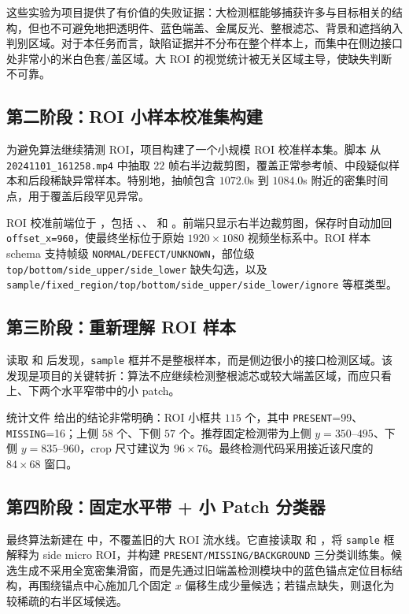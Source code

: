 \documentclass[a4paper,12pt]{article}
\newcommand{\code}[1]{\texttt{#1}}
\begin{document}
这些实验为项目提供了有价值的失败证据：大检测框能够捕获许多与目标相关的结构，但也不可避免地把透明件、蓝色端盖、金属反光、整根滤芯、背景和遮挡纳入判别区域。对于本任务而言，缺陷证据并不分布在整个样本上，而集中在侧边接口处非常小的米白色套/盖区域。大 ROI 的视觉统计被无关区域主导，使缺失判断不可靠。

\subsection{第二阶段：ROI 小样本校准集构建}
为避免算法继续猜测 ROI，项目构建了一个小规模 ROI 校准样本集。脚本  从 \code{20241101\_161258.mp4} 中抽取 $22$ 帧右半边裁剪图，覆盖正常参考帧、中段疑似样本和后段稀缺异常样本。特别地，抽帧包含 $1072.0$s 到 $1084.0$s 附近的密集时间点，用于覆盖后段罕见异常。

ROI 校准前端位于 ，包括 、、 和 。前端只显示右半边裁剪图，保存时自动加回 \code{offset\_x=960}，使最终坐标位于原始 $1920\times1080$ 视频坐标系中。ROI 样本 schema 支持帧级 \code{NORMAL/DEFECT/UNKNOWN}，部位级 \code{top/bottom/side\_upper/side\_lower} 缺失勾选，以及 \code{sample/fixed\_region/top/bottom/side\_upper/side\_lower/ignore} 等框类型。

\subsection{第三阶段：重新理解 ROI 样本}
读取  和  后发现，\code{sample} 框并不是整根样本，而是侧边很小的接口检测区域。该发现是项目的关键转折：算法不应继续检测整根滤芯或较大端盖区域，而应只看上、下两个水平窄带中的小 patch。

统计文件  给出的结论非常明确：ROI 小框共 $115$ 个，其中 \code{PRESENT}=99、\code{MISSING}=16；上侧 $58$ 个、下侧 $57$ 个。推荐固定检测带为上侧 $y=350$--$495$、下侧 $y=835$--$960$，crop 尺寸建议为 $96\times76$。最终检测代码采用接近该尺度的 $84\times68$ 窗口。

\subsection{第四阶段：固定水平带 + 小 Patch 分类器}
最终算法新建在  中，不覆盖旧的大 ROI 流水线。它直接读取  和 ，将 \code{sample} 框解释为 side micro ROI，并构建 \code{PRESENT/MISSING/BACKGROUND} 三分类训练集。候选生成不采用全宽密集滑窗，而是先通过旧端盖检测模块中的蓝色锚点定位目标结构，再围绕锚点中心施加几个固定 $x$ 偏移生成少量候选；若锚点缺失，则退化为较稀疏的右半区域候选。
\end{document}
